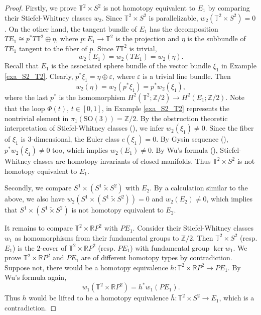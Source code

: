 \documentclass[12pt]{amsart}
\theoremstyle{plain}
\theoremstyle{definition}
\theoremstyle{question}
\theoremstyle{remark}
\theoremstyle{assumption}
\numberwithin{equation}{section}
\theoremstyle{bigthm}
\begin{document}
\begin{proof}
Firstly, we prove $\mathbb{T}^{2} \times S^{2}$ is not homotopy equivalent to $E_{1}$ by comparing their Stiefel-Whitney classes $w_{2}$. Since $\mathbb{T}^{2} \times S^{2}$ is parallelizable, $w_{2} (\mathbb{T}^{2} \times S^{2}) = 0$. On the other hand, the tangent bundle of $E_{1}$ has the decomposition $TE_{1} \cong p^{*} T \mathbb{T}^{2} \oplus \eta$, where $p \colon  E_{1} \rightarrow \mathbb{T}^{2}$ is the projection and $\eta$ is the subbundle of $TE_{1}$ tangent to the fiber of $p$. Since $T \mathbb{T}^{2}$ is trivial,
\[
w_{2} (E_{1}) = w_{2} (T E_{1}) = w_{2} (\eta).
\]
Recall that $E_{1}$ is the associated sphere bundle of the vector bundle $\xi_{1}$ in Example \ref{exa_S2_T2}. Clearly, $p^{*} \xi_{1} = \eta \oplus \varepsilon$, where $\varepsilon$ is a trivial line bundle. Then
\[
w_{2} (\eta) = w_{2} (p^{*} \xi_{1}) = p^{*} w_{2} (\xi_{1}),
\]
where the last $p^{*}$ is the homomorphism $H^{2} (\mathbb{T}^{2}; \mathbb{Z}/2) \rightarrow H^{2} (E_{1}; \mathbb{Z}/2)$. Note that the loop $\Phi (t)$, $t \in [0,1]$, in Example \ref{exa_S2_T2} represents the nontrivial element in $\pi_{1} (\mathrm{SO} (3)) = \mathbb{Z} /2$. By the obstruction theoretic interpretation of Stiefel-Whitney classes (\cite[Theorem~12.1]{Milnor_Stasheff}), we infer $w_{2} (\xi_{1}) \ne 0$. Since the fiber of $\xi_{1}$ is $3$-dimensional, the Euler class $e (\xi_{1}) =0$. By Gysin sequence (\cite[Theorem~12.2]{Milnor_Stasheff}), $p^{*} w_{2} (\xi_{1}) \ne 0$ too, which implies $w_{2} (E_{1}) \ne 0$. By Wu's formula (\cite[Theorem~11.14]{Milnor_Stasheff}), Stiefel-Whitney classes are homotopy invariants of closed manifolds. Thus $\mathbb{T}^{2} \times S^{2}$ is not homotopy equivalent to $E_{1}$.

Secondly, we compare $S^{1} \times (S^{1} \tilde{\times} S^{2})$ with $E_{2}$. By a calculation similar to the above, we also have $w_{2} (S^{1} \times (S^{1} \tilde{\times} S^{2})) =0$ and $w_{2} (E_{2}) \ne 0$, which implies that $S^{1} \times (S^{1} \tilde{\times} S^{2})$ is not homotopy equivalent to $E_{2}$.

It remains to compare $\mathbb{T}^{2} \times \mathbb{R} P^{2}$ with $PE_{1}$. Consider their Stiefel-Whitney classes $w_{1}$ as homomorphisms from their fundamental groups to $\mathbb{Z} /2$. Then $\mathbb{T}^{2} \times S^{2}$ (resp. $E_{1}$) is the $2$-cover of $\mathbb{T}^{2} \times \mathbb{R} P^{2}$ (resp. $PE_{1}$) with fundamental group $\ker w_{1}$. We prove $\mathbb{T}^{2} \times \mathbb{R} P^{2}$ and $PE_{1}$ are of different homotopy types by contradiction. Suppose not, there would be a homotopy equivalence $h \colon  \mathbb{T}^{2} \times \mathbb{R} P^{2} \rightarrow PE_{1}$. By Wu's formula again,
\[
w_{1} (\mathbb{T}^{2} \times \mathbb{R} P^{2}) = h^{*} w_{1} (PE_{1}).
\]
Thus $h$ would be lifted to be a homotopy equivalence $\bar{h} \colon  \mathbb{T}^{2} \times S^{2} \rightarrow E_{1}$, which is a contradiction.
\end{proof}
\end{document}
